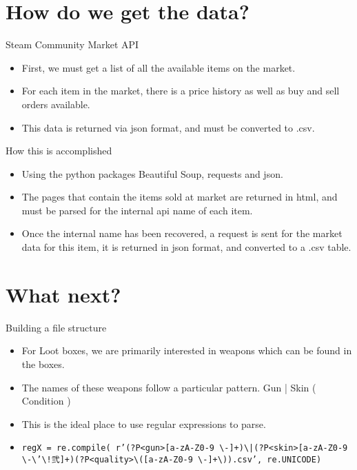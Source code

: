 \documentclass[bigger]{beamer}
\begin{document}
\section{How do we get the data?}
\label{sec-2}

\begin{frame}[label=sec-2-1]{Steam Community Market API}
\begin{itemize}
\item First, we must get a list of all the available items on the market.
\item For each item in the market, there is a price history as well as
buy and sell orders available.
\item This data is returned via json format, and must be converted to .csv.
\end{itemize}
\end{frame}

\begin{frame}[label=sec-2-2]{How this is accomplished}
\begin{itemize}
\item Using the python packages Beautiful Soup, requests and json.
\item The pages that contain the items sold at market are returned in
html, and must be parsed for the internal api name of each item.
\item Once the internal name has been recovered, a request is sent for the
market data for this item, it is returned in json format, and
converted to a .csv table.
\end{itemize}
\end{frame}

\section{What next?}
\label{sec-3}

\begin{frame}[fragile,label=sec-3-1]{Building a file structure}
 \begin{itemize}
\item For Loot boxes, we are primarily interested in weapons which can be
found in the boxes.
\item The names of these weapons follow a particular pattern. Gun | Skin (
Condition )
\item This is the ideal place to use regular expressions to parse.
\item \texttt{regX = re.compile( r'(?P<gun>[a-zA-Z0-9 \textbackslash{}-]+)\textbackslash{}|(?P<skin>[a-zA-Z0-9
  \textbackslash{}-\textbackslash{}'\textbackslash{}!弐]+)(?P<quality>\textbackslash{}([a-zA-Z0-9 \textbackslash{}-]+\textbackslash{})).csv', re.UNICODE)}
\end{itemize}
\end{frame}
\end{document}
